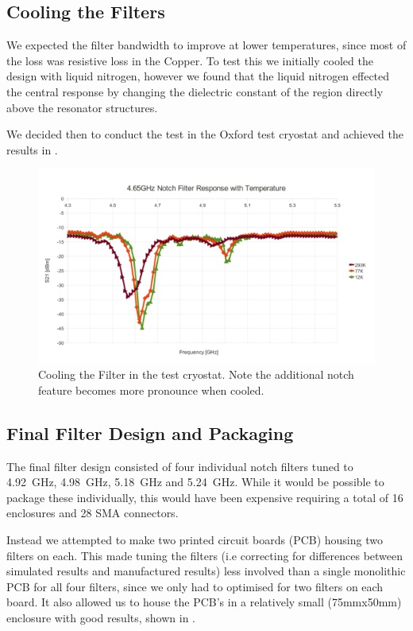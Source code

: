 \clearpage
\subsection{Cooling the Filters}

We expected the filter bandwidth to improve at lower temperatures, since most of the loss was resistive loss in the Copper. To test this we initially cooled the design with liquid nitrogen, however we found that the liquid nitrogen effected the central response by changing the dielectric constant of the region directly above the resonator structures.

We decided then to conduct the test in the Oxford test cryostat and achieved the results in .

\begin{figure}[ht]
 \centering
 \includegraphics[width=\textwidth]{./images/NotchFilter/CoolingResponse.jpg}
 \caption{Cooling the Filter in the test cryostat. Note the additional notch feature becomes more pronounce when cooled.}
 \label{fig:coolingResponse}
\end{figure}

\subsection{Final Filter Design and Packaging}
The final filter design consisted of four individual notch filters tuned to 4.92~GHz, 4.98~GHz, 5.18~GHz and 5.24~GHz. While it would be possible to package these individually, this would have been expensive requiring a total of 16 enclosures and 28 SMA connectors. 

Instead we attempted to make two printed circuit boards (PCB) housing two filters on each. This made tuning the filters (i.e correcting for differences between simulated results and manufactured results) less involved than a single monolithic PCB for all four filters, since we only had to optimised for two filters on each board. It also allowed us to house the PCB's in a relatively small (75mmx50mm) enclosure with good results, shown in .

